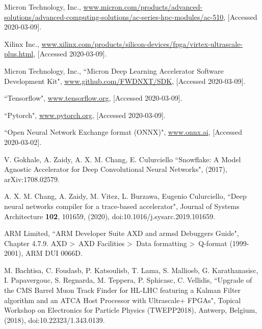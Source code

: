 \documentclass[10pt, paper=a4, UKenglish]{article}
\begin{document}
\begin{thebibliography}{99}
  Micron Technology, Inc.,
  \url{www.micron.com/products/advanced-solutions/advanced-computing-solutions/ac-series-hpc-modules/ac-510},
  [Accessed 2020-03-09].
  
  Xilinx Inc.,
  \url{www.xilinx.com/products/silicon-devices/fpga/virtex-ultrascale-plus.html},
  [Accessed 2020-03-09].
 
  Micron Technology, Inc.,
  “Micron Deep Learning Accelerator Software Development Kit",
  \url{www.github.com/FWDNXT/SDK},
  [Accessed 2020-03-09].
  
  “Tensorflow",
  \url{www.tensorflow.org},
  [Accessed 2020-03-09].
  
  “Pytorch",
  \url{www.pytorch.org},
  [Accessed 2020-03-09].
  
  “Open Neural Network Exchange format (ONNX)",
  \url{www.onnx.ai},
  [Accessed 2020-03-02].
  
  V. Gokhale, A. Zaidy, A. X. M. Chang, E. Culurciello
  “Snowflake: A Model Agnostic Accelerator for Deep Convolutional Neural Networks",
  (2017),
  arXiv:1708.02579.
  
  A. X. M. Chang, A. Zaidy, M. Vitez, L. Burzawa, Eugenio Culurciello,
  “Deep neural networks compiler for a trace-based accelerator",
  Journal of Systems Architecture {\bf 102}, 101659, (2020),
  doi:10.1016/j.sysarc.2019.101659.

  ARM Limited,
  “ARM Developer Suite AXD and armsd Debuggers Guide",
  Chapter 4.7.9. AXD \textgreater~AXD Facilities \textgreater~Data formatting \textgreater~Q-format
  (1999-2001),
  ARM DUI 0066D.

  M. Bachtisa, C. Foudasb, P. Katsoulisb, T. Lama, S. Malliosb, G. Karathanasisc, I. Papavergouc, S. Regnarda, M. Teppera, P. Sphicasc, C. Vellidis,
  “Upgrade of the CMS Barrel Muon Track Finder for HL-LHC featuring a Kalman Filter algorithm and an ATCA Host Processor with Ultrascale+ FPGAs",
  Topical Workshop on Electronics for Particle Physics (TWEPP2018), Antwerp, Belgium, (2018),
  doi:10.22323/1.343.0139.

\end{thebibliography}

\end{document}
